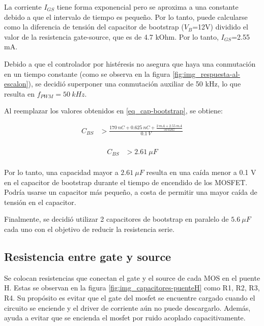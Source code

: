 \noindent La corriente $I_{GS}$ tiene forma exponencial pero se aproxima a una constante debido a que el intervalo de tiempo es pequeño. Por lo tanto, puede calcularse como la diferencia de tensión del capacitor de bootstrap ($V_B$=12V) dividido el valor de la resistencia gate-source, que es de 4.7 kOhm. Por lo tanto, $I_{GS}$=2.55 mA. 

\noindent Debido a que el controlador por histéresis no asegura que haya una conmutación en un tiempo constante (como se observa en la figura \ref{fig:img_respuesta-al-escalon}), se decidió superponer una conmutación auxiliar de 50 kHz, lo que resulta en $f_{PWM}=50 \:kHz$. 

\noindent Al reemplazar los valores obtenidos en \ref{eq_cap-bootstrap}, se obtiene:

\begin{equation*} 
	\begin{aligned}
		C_{BS} &> \frac{170 \:nC + 0.625\:nC + \frac{2 \:mA + 2.55 \:mA}{50 \:kHz}}{0.1 \:V}\\
	\end{aligned}
\end{equation*}

\begin{equation*} 
	\begin{aligned}
		C_{BS} &> 2.61 \:\mu F\\	
	\end{aligned}
\end{equation*}


\noindent Por lo tanto, una capacidad mayor a $2.61 \:\mu F$ resulta en una caída menor a 0.1 V en el capacitor de bootstrap durante el tiempo de encendido de los MOSFET. Podría usarse un capacitor más pequeño, a costa de permitir una mayor caída de tensión en el capacitor. 

\noindent Finalmente, se decidió utilizar 2 capacitores de bootstrap en paralelo de $5.6 \:\mu F$ cada uno con el objetivo de reducir la resistencia serie.


\subsection{Resistencia entre gate y source} \label{secc_res_gate_source}

\noindent Se colocan resistencias que conectan el gate y el source de cada MOS en el puente H. Estas se observan en la figura \ref{fig:img_capacitores-puenteH} como R1, R2, R3, R4. Su propósito es evitar que el gate del mosfet se encuentre cargado cuando el circuito se enciende y el driver de corriente aún no puede descargarlo. Además, ayuda a evitar que se encienda el mosfet por ruido acoplado capacitivamente. 

